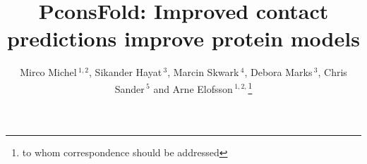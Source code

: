 \documentclass{bioinfo}
\begin{document}

\title[PconsFold]{PconsFold: Improved contact predictions improve
  protein models}
\author[M.Michel \textit{et~al}]{Mirco Michel\,$^{1,2}$, Sikander Hayat\,$^{3}$, Marcin Skwark\,$^{4}$, Debora Marks\,$^{3}$, Chris Sander\,$^{5}$ and Arne Elofsson\,$^{1,2,}$\footnote{to whom correspondence should be addressed}}
\address{$^{1}$Department of Biochemistry and Biophysics, Stockholm University, 10691 Stockholm, Sweden, 
$^{2}$Science for Life Laboratory, Box 1031, 17121 Solna, Sweden, 
$^{3}$Department of Systems Biology, Harvard Medical School, Boston, Massachusetts, USA, 
$^{4}$Department of Information and Computer Science, Aalto University, PO Box 15400, FI-00076 Aalto, Finland, and
$^{5}$Computational Biology Center, Memorial Sloan-Kettering Cancer Center, New York, New York, USA}



\maketitle
\end{document}
